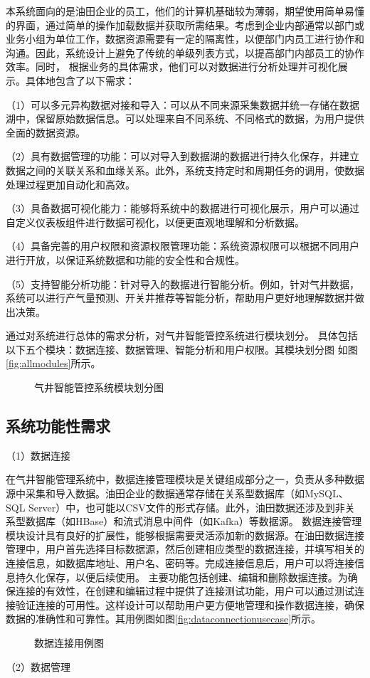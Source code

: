 本系统面向的是油田企业的员工，他们的计算机基础较为薄弱，期望使用简单易懂的界面，通过简单的操作加载数据并获取所需结果。考虑到企业内部通常以部门或业务小组为单位工作，数据资源需要有一定的隔离性，以便部门内员工进行协作和沟通。因此，系统设计上避免了传统的单级列表方式，以提高部门内部员工的协作效率。同时，
根据业务的具体需求，他们可以对数据进行分析处理并可视化展示。具体地包含了以下需求：

（1）可以多元异构数据对接和导入：可以从不同来源采集数据并统一存储在数据湖中，保留原始数据信息。可以处理来自不同系统、不同格式的数据，为用户提供全面的数据资源。

（2）具有数据管理的功能：可以对导入到数据湖的数据进行持久化保存，并建立数据之间的关联关系和血缘关系。此外，系统支持定时和周期任务的调用，使数据处理过程更加自动化和高效。

（3）具备数据可视化能力：能够将系统中的数据进行可视化展示，用户可以通过自定义仪表板组件进行数据可视化，以便更直观地理解和分析数据。

（4）具备完善的用户权限和资源权限管理功能：系统资源权限可以根据不同用户进行开放，以保证系统数据和功能的安全性和合规性。

（5）支持智能分析功能：针对导入的数据进行智能分析。例如，针对气井数据，系统可以进行产气量预测、开关井推荐等智能分析，帮助用户更好地理解数据并做出决策。

通过对系统进行总体的需求分析，对气井智能管控系统进行模块划分。
具体包括以下五个模块：数据连接、数据管理、智能分析和用户权限。其模块划分图
如图\ref{fig:allmodules}所示。
\begin{figure}[H]
    \centering
    \caption{气井智能管控系统模块划分图}
\end{figure}
\subsection{系统功能性需求}
（1）数据连接

在气井智能管理系统中，数据连接管理模块是关键组成部分之一，负责从多种数据源中采集和导入数据。油田企业的数据通常存储在关系型数据库（如MySQL、SQL Server）中，也可能以CSV文件的形式存储。此外，油田数据还涉及到非关系型数据库（如HBase）和流式消息中间件（如Kafka）等数据源。
数据连接管理模块设计具有良好的扩展性，能够根据需要灵活添加新的数据源。在油田数据连接管理中，用户首先选择目标数据源，然后创建相应类型的数据连接，并填写相关的连接信息，如数据库地址、用户名、密码等。完成连接信息后，用户可以将连接信息持久化保存，以便后续使用。
主要功能包括创建、编辑和删除数据连接。为确保连接的有效性，在创建和编辑过程中提供了连接测试功能，用户可以通过测试连接验证连接的可用性。这样设计可以帮助用户更方便地管理和操作数据连接，确保数据的准确性和可靠性。其用例图如图\ref{fig:dataconnectionusecase}所示。
\begin{figure}[H]
    \centering
    \caption{数据连接用例图}
\end{figure}
（2）数据管理 

